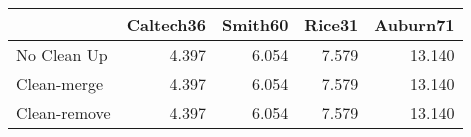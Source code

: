 \begin{tabular}{lrrrr}
\toprule
{} & Caltech36 & Smith60 & Rice31 & Auburn71 \\
\midrule
No Clean Up  &     4.397 &   6.054 &  7.579 &   13.140 \\
Clean-merge  &     4.397 &   6.054 &  7.579 &   13.140 \\
Clean-remove &     4.397 &   6.054 &  7.579 &   13.140 \\
\bottomrule
\end{tabular}
